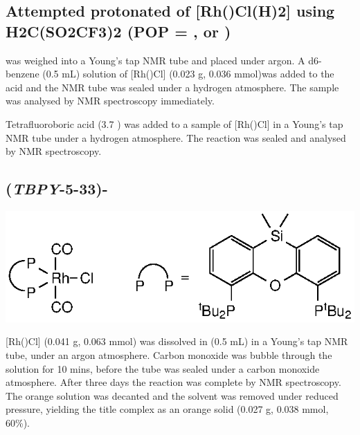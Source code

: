 
\subsection*{Attempted protonated of [Rh(\POP)Cl(H)2] using H2C(SO2CF3)2 (POP = \tBusixantphos, \tButhixantphos{} or \tBuxantphos)}

 was weighed into a Young's tap NMR tube and placed under argon.  A d6-benzene (0.5 mL) solution of [Rh(\POP)Cl] (0.023 g, 0.036 mmol)was added to the acid and the NMR tube was sealed under a hydrogen atmosphere.  The sample was analysed by NMR spectroscopy immediately.  


Tetrafluoroboric acid (3.7 ) was added to a sample of [Rh(\POP)Cl] in a Young's tap NMR tube under a hydrogen atmosphere.  The reaction was sealed and analysed by NMR spectroscopy.  


\subsection*{(\emph{TBPY}-5-33)-}

\begin{structure}[h]
\begin{center}
\includegraphics{../Structures/RhCl(SitBu)(CO)2.eps}
\end{center}
\end{structure}

[Rh(\tBusixantphos)Cl] (0.041 g, 0.063 mmol) was dissolved in  (0.5 mL) in a Young's tap NMR tube, under an argon atmosphere.  Carbon monoxide was bubble through the solution for 10 mins, before the tube was sealed under a carbon monoxide atmosphere.  After three days the reaction was complete by \phosphorus{} NMR spectroscopy.  The orange solution was decanted and the solvent was removed under reduced pressure, yielding the title complex as an orange solid (0.027 g, 0.038 mmol, 60\%). 

